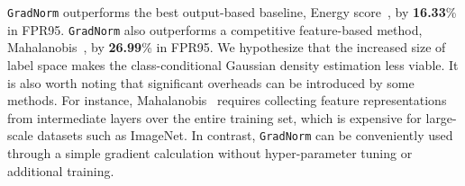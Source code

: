 \documentclass{article}
\begin{document}
\texttt{GradNorm} outperforms the best output-based baseline, Energy score~\cite{liu2020energy}, by \textbf{16.33}\% in FPR95. \texttt{GradNorm} also outperforms a competitive feature-based method, Mahalanobis~\cite{lee2018simple}, by \textbf{26.99}\% in FPR95. We hypothesize that the increased size of label space makes the class-conditional Gaussian density estimation less viable. It is also worth noting that significant overheads can be introduced by some methods. 
For instance, Mahalanobis~\cite{lee2018simple} requires collecting feature representations from intermediate layers over the entire training set, which is expensive for large-scale datasets such as ImageNet. 
In contrast, \texttt{GradNorm} can be conveniently used through a simple gradient calculation without hyper-parameter tuning or additional training.




\end{document}
